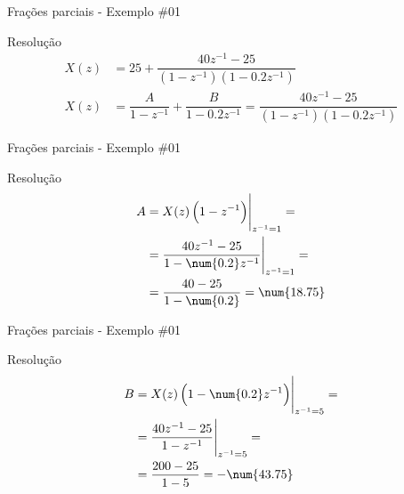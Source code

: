 \begin{frame}{Frações parciais - Exemplo \#01}
\begin{block}{Resolução}
	\begin{align*}
	X(z)&=25+\dfrac{40z^{-1}-25}{(1-z^{-1})(1-\num{0.2}z^{-1})}\\
	X(z)&=\dfrac{A}{1-z^{-1}}+\dfrac{B}{1-\num{0,2}z^{-1}}=\dfrac{40z^{-1}-25}{(1-z^{-1})(1-\num{0,2}z^{-1})}
	\end{align*}
\end{block}
\end{frame}

\begin{frame}{Frações parciais - Exemplo \#01}
\begin{block}{Resolução}
	\begin{align*}
	A&=\eval{X(z)\left(1-z^{-1}\right)}_{z^{-1}=1}=\\
	&=\eval{\dfrac{40z^{-1}-25}{1-\num{0.2}z^{-1}}}_{z^{-1}=1}=\\
	&=\dfrac{40-25}{1-\num{0.2}}=\num{18.75}
	\end{align*}
\end{block}
\end{frame}

\begin{frame}{Frações parciais - Exemplo \#01}
\begin{block}{Resolução}
	\begin{align*}
	B&=\eval{X(z)\left(1-\num{0.2}z^{-1}\right)}_{z^{-1}=5}=\\
	&=\eval{\dfrac{40z^{-1}-25}{1-z^{-1}}}_{z^{-1}=5}=\\
	&=\dfrac{200-25}{1-5}=-\num{43.75}
	\end{align*}
\end{block}
\end{frame}

